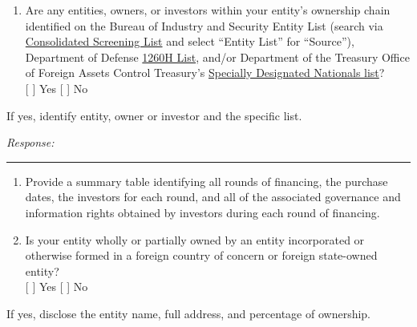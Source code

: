 \documentclass[
]{article}
\providecommand{\tightlist}{%
  \setlength{\itemsep}{0pt}\setlength{\parskip}{0pt}}
\begin{document}
\begin{enumerate}
  \begin{enumerate}
  \def\labelenumii{\arabic{enumii}.}
  \tightlist
  \item
    For your entity's ultimate parent, please identify all owners with
    greater than a five percent ownership interest.
  \item
    For entities, please identify the locations of incorporation and
    principal places of business. For individuals, please identify
    countries of citizenship.
  \end{enumerate}
\item
  Are any entities, owners, or investors within your entity's ownership
  chain identified on the Bureau of Industry and Security Entity List
  (search via
  \href{https://www.trade.gov/data-visualization/csl-search}{Consolidated
  Screening List} and select ``Entity List'' for ``Source''), Department
  of Defense
  \href{https://media.defense.gov/2025/Jan/07/2003625471/-1/-1/1/ENTITIES-IDENTIFIED-AS-CHINESE-MILITARY-COMPANIES-OPERATING-IN-THE-UNITED-STATES.PDF}{1260H
  List}, and/or Department of the Treasury Office of Foreign Assets
  Control Treasury's
  \href{https://sanctionssearch.ofac.treas.gov/}{Specially Designated
  Nationals list}?\\
  {[} {]} Yes {[} {]} No
\end{enumerate}

If yes, identify entity, owner or investor and the specific list.

\emph{Response:}

\begin{center}\rule{0.5\linewidth}{0.5pt}\end{center}

\begin{enumerate}
\def\labelenumi{\arabic{enumi}.}
\setcounter{enumi}{4}
\item
  Provide a summary table identifying all rounds of financing, the
  purchase dates, the investors for each round, and all of the
  associated governance and information rights obtained by investors
  during each round of financing.
\item
  Is your entity wholly or partially owned by an entity incorporated or
  otherwise formed in a foreign country of concern or foreign
  state-owned entity?\\
  {[} {]} Yes {[} {]} No
\end{enumerate}

If yes, disclose the entity name, full address, and percentage of
ownership.
\end{document}
